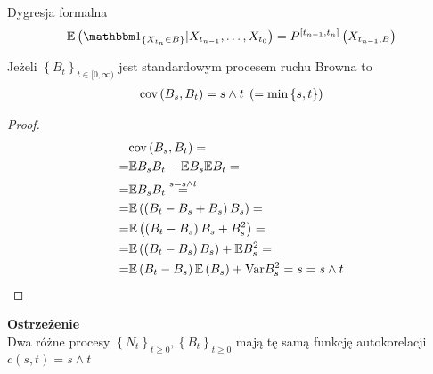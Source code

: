 Dygresja formalna
\begin{gather*}
\mathbb E \left(\mathbbm1_{\left\{X_{t_n}\in B\right\}}|X_{t_{n-1}},\dots,X_{t_0}\right)=P^{[t_{n-1},t_n]}\left(X_{t_{n-1},B}\right)
\end{gather*}
\begin{twr}
Jeżeli $ \left\{B_t\right\} _{t\in [0,\infty )}$ jest standardowym procesem ruchu Browna to
\begin{gather*}
\text{cov} \left(B_s,B_t\right)=s\wedge t\;\left(=\min\left\{s,t\right\}\right)
\end{gather*}
\begin{proof}
\begin{align*}
&
\text{cov} \left(B_s,B_t\right)
=\\=&
\mathbb E B_sB_t-\mathbb E B_s\mathbb E B_t
=\\=&
\mathbb E B_sB_t
\stackrel{s=s\wedge t}{=}\\=&
\mathbb E \left(\left(B_t-B_s+B_s\right)B_s\right)
=\\=&
\mathbb E \left(\left(B_t-B_s\right)B_s+B_s^2\right)
=\\=&
\mathbb E \left(\left(B_t-B_s\right)B_s\right)+\mathbb EB_s^2
=\\=&
\mathbb E \left(B_t-B_s\right)\mathbb E \left(B_s\right)+\text{Var} B_s^2=s=s\wedge t
\end{align*}
\end{proof}
\end{twr}
\textbf{Ostrzeżenie}\\
Dwa różne procesy $ \left\{N_t\right\}_{t\ge 0},\left\{B_t\right\}_{t\ge 0} $ mają tę samą funkcję autokorelacji $ c(s,t)=s\wedge t $
